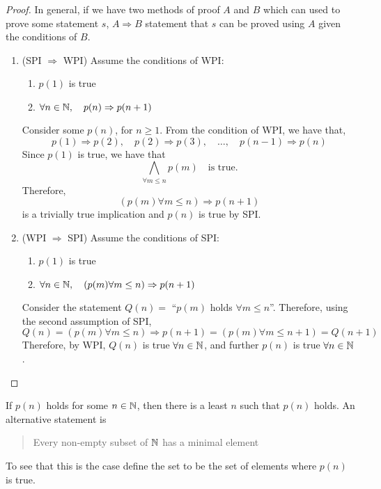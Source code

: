 \documentclass{article}
\begin{document}
\begin{proof}\leavevmode
    In general, if we have two methods of proof $A$ and $B$ which can used to prove some statement $s$, $A \Rightarrow B$ statement that $s$ can be proved using $A$ given the conditions of $B$. 
    \begin{enumerate}
        \item (SPI $\Rightarrow$ WPI) Assume the conditions of WPI: 
            \begin{enumerate}
                \item $p(1)$ is true
                \item $\forall n \in \mathbb{N}, \quad p(n) \Rightarrow p(n+1)$
            \end{enumerate}
            Consider some $p(n)$, for $n \geq 1$. From the condition of WPI, we have that,
            \[
                p(1) \Rightarrow p(2), \quad p(2) \Rightarrow p(3), \quad \ldots, \quad p(n-1) \Rightarrow p(n)  
            \]
            Since $p(1)$ is true, we have that
            \[ 
                \bigwedge_{\forall m \leq n}{p(m)} \quad \text{is true.}
            \]
            Therefore,
            \[
                (p(m) \forall m \leq n) \Rightarrow p(n + 1)
            \]
            is a trivially true implication and $p(n)$ is true by SPI.
        \item (WPI $\Rightarrow$ SPI) Assume the conditions of SPI:
            \begin{enumerate}
                \item $p(1)$ is true
                \item $\forall n \in \mathbb{N}, \quad (p(m) \forall m \leq n) \Rightarrow p(n + 1)$
            \end{enumerate}
            Consider the statement $Q(n) = $ ``$p(m)$ holds $\forall m \leq n$''. Therefore, using the second assumption of SPI,
            \[
                Q(n) = (p(m) \forall m \leq n) \Rightarrow p(n + 1) = (p(m) \forall m \leq n+1) = Q(n + 1)
            \]
            Therefore, by WPI, $Q(n)$ is true $\forall n \in \mathbb{N}$, and further $p(n)$ is true $\forall n \in \mathbb{N}$.
    \end{enumerate}
\end{proof}

\begin{defi}
    If $p(n)$ holds for some $n \in \mathbb{N}$, then there is a least $n$ such that $p(n)$ holds. An alternative statement is 
    \begin{quote}
        Every non-empty subset of $\mathbb{N}$ has a minimal element
    \end{quote}
    To see that this is the case define the set to be the set of elements where $p(n)$ is true.
\end{defi}
\end{document}
